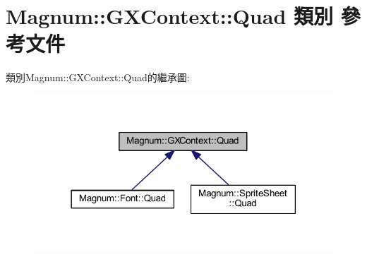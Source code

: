 \hypertarget{class_magnum_1_1_g_x_context_1_1_quad}{}\section{Magnum\+:\+:G\+X\+Context\+:\+:Quad 類別 參考文件}
\label{class_magnum_1_1_g_x_context_1_1_quad}


類別\+Magnum\+:\+:G\+X\+Context\+:\+:Quad的繼承圖\+:\nopagebreak
\begin{figure}[H]
\begin{center}
\leavevmode
\includegraphics[width=318pt]{class_magnum_1_1_g_x_context_1_1_quad__inherit__graph}
\end{center}
\end{figure}
